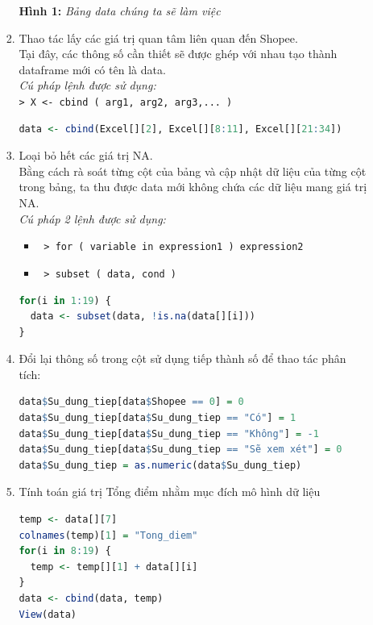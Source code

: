 \documentclass[a4paper]{article}
\theoremstyle{definition}
\begin{document}
\begin{itemize}
\begin{itemize}
\begin{enumerate}
    \begin{center}
        \textbf{Hình 1: }\textit{Bảng data chúng ta sẽ làm việc}
    \end{center}
\item Thao tác lấy các giá trị quan tâm liên quan đến Shopee. \\
Tại đây, các thông số cần thiết sẽ được ghép với nhau tạo thành dataframe mới có tên là data.\\
\textit{Cú pháp lệnh được sử dụng:}\\
\texttt {> X <- cbind ( arg1, arg2, arg3,... )}
\begin{lstlisting}[language=R, caption=Nhập dữ liệu (tiếp theo)]
data <- cbind(Excel[][2], Excel[][8:11], Excel[][21:34])
\end{lstlisting}
\item Loại bỏ hết các giá trị NA.\\
Bằng cách rà soát từng cột của bảng và cập nhật dữ liệu của từng cột trong bảng, ta thu được data mới không chứa các dữ liệu mang giá trị NA.\\
\textit{Cú pháp 2 lệnh được sử dụng:}
\begin{itemize}
    \item \texttt{ > for ( variable in expression1 ) expression2}
    \item \texttt{ > subset ( data, cond )}
\end{itemize}
\begin{lstlisting}[language=R, caption=Nhập dữ liệu (tiếp theo)]
for(i in 1:19) {
  data <- subset(data, !is.na(data[][i]))
}
\end{lstlisting}
\item Đổi lại thông số trong cột sử dụng tiếp thành số để thao tác phân tích: 
\begin{lstlisting}[language=R, caption=Nhập dữ liệu (tiếp theo)]
data$Su_dung_tiep[data$Shopee == 0] = 0
data$Su_dung_tiep[data$Su_dung_tiep == "Có"] = 1
data$Su_dung_tiep[data$Su_dung_tiep == "Không"] = -1
data$Su_dung_tiep[data$Su_dung_tiep == "Sẽ xem xét"] = 0
data$Su_dung_tiep = as.numeric(data$Su_dung_tiep)
\end{lstlisting}
\item Tính toán giá trị Tổng điểm nhằm mục đích mô hình dữ liệu
\begin{lstlisting}[language=R, caption=Nhập dữ liệu (tiếp theo)]
temp <- data[][7]
colnames(temp)[1] = "Tong_diem"
for(i in 8:19) {
  temp <- temp[][1] + data[][i]
}
data <- cbind(data, temp)
View(data)
\end{lstlisting}

\end{enumerate}
\end{itemize}
\end{itemize}
\end{document}
